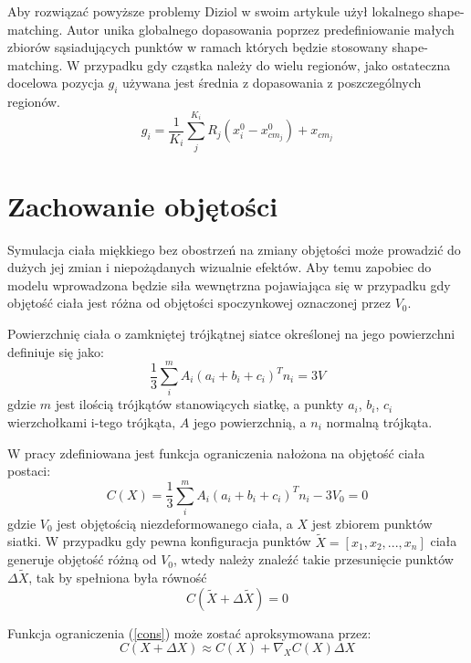 Aby rozwiązać powyższe problemy Diziol w swoim artykule \cite{diziol} użył
lokalnego shape-matching. Autor unika globalnego dopasowania poprzez
predefiniowanie małych zbiorów sąsiadujących punktów w ramach których będzie
stosowany shape-matching.  W przypadku gdy cząstka należy do wielu regionów,
		  jako ostateczna docelowa pozycja $g_i$ używana jest średnia z
		  dopasowania z poszczególnych regionów.
\begin{equation}
g_i = \frac{1}{K_i} \sum_j^{K_i} R_j (x^0_i - x^0_{cm_j}) + x_{cm_j}
\end{equation}

\section{Zachowanie objętości}
\label{sec:vol}
Symulacja ciała miękkiego bez obostrzeń na zmiany objętości może
prowadzić do dużych jej zmian i niepożądanych wizualnie efektów. 
Aby temu zapobiec do modelu wprowadzona będzie siła wewnętrzna pojawiająca się w
przypadku gdy objętość ciała jest różna od objętości spoczynkowej oznaczonej
przez $V_0$.

Powierzchnię ciała o zamkniętej trójkątnej siatce określonej na jego powierzchni definiuje
się jako: \cite{diziol}
\begin{equation}
\label{obj}
\frac{1}{3} \sum_i^m A_i (a_i + b_i + c_i)^T n_i = 3V
\end{equation}
gdzie $m$ jest ilością trójkątów stanowiących siatkę, a punkty $a_i$, $b_i$,
	  $c_i$ wierzchołkami i-tego trójkąta, $A$ jego powierzchnią, a $n_i$
	  normalną trójkąta.

W pracy \cite{diziol} zdefiniowana jest funkcja ograniczenia nałożona na
objętość ciała postaci:
\begin{equation}
\label{cons}
C(X) = \frac{1}{3} \sum_i^m A_i (a_i + b_i + c_i)^T n_i - 3V_0 = 0
\end{equation}
gdzie $V_0$ jest objętością niezdeformowanego ciała, a $X$ jest zbiorem punktów
siatki. W przypadku gdy pewna konfiguracja punktów $\tilde{X} = [x_1, x_2,...,
	x_n] $ ciała generuje
objętość różną od $V_0$, wtedy należy znaleźć takie przesunięcie punktów $\Delta
\tilde{X}$, tak by spełniona była równość 
$$C(\tilde{X} + \Delta \tilde{X}) = 0$$

Funkcja ograniczenia (\ref{cons}) może zostać aproksymowana przez:
\begin{equation}
\label{e1}
C(X + \Delta X) \approx C(X) + \nabla_X C(X) \Delta X
\end{equation}

